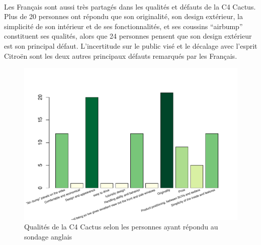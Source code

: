 \documentclass[12pt]{article}\usepackage[]{graphicx}\usepackage[]{color}
\makeatletter
\def\maxwidth{ %
  \ifdim\Gin@nat@width>\linewidth
    \linewidth
  \else
    \Gin@nat@width
  \fi
}
\newenvironment{knitrout}{}{} %
\makeatother
\begin{document}
\paragraph{} Les Français sont aussi très partagés dans les qualités et défauts
de la C4 Cactus. Plus de 20 personnes ont répondu que son originalité, son
design extérieur, la simplicité de son intérieur et de ses fonctionnalités, et
ses coussins ``airbump'' constituent ses qualités, alors que 24 personnes
pensent que son design extérieur est son
principal défaut. L'incertitude sur le public visé et le décalage avec l'esprit
Citroën sont les deux autres principaux défauts remarqués par les
Français.

\begin{knitrout}
\color{fgcolor}\begin{figure}[H]
\includegraphics[width=\maxwidth]{figure/qualities_en-1} \caption[Qualités de la C4 Cactus selon les personnes ayant répondu au sondage anglais]{Qualités de la C4 Cactus selon les personnes ayant répondu au sondage anglais}\label{fig:qualities en}
\end{figure}


\end{knitrout}
\end{document}
